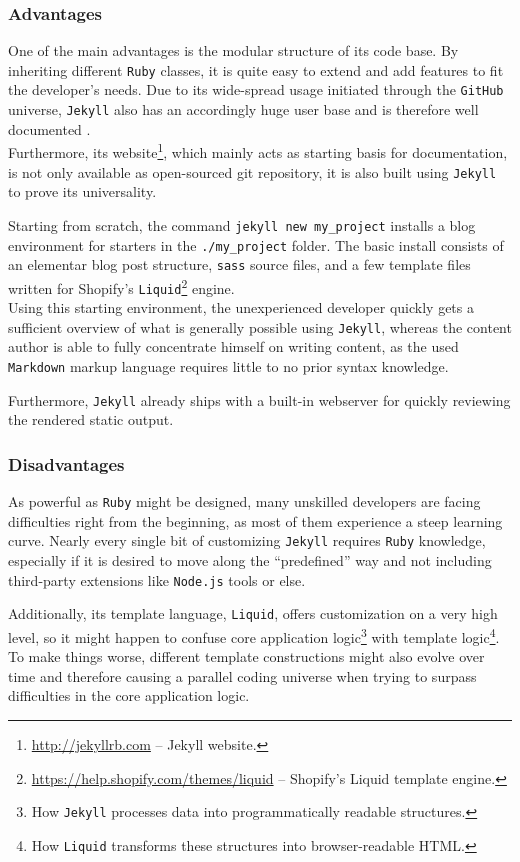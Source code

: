 \subsubsection{Advantages}
One of the main advantages is the modular structure of its code base. By inheriting different \texttt{Ruby} classes, it is quite easy to extend and add features to fit the developer's needs. Due to its wide-spread usage initiated through the \texttt{GitHub} universe, \texttt{Jekyll} also has an accordingly huge user base and is therefore well documented \cite[26]{dhillon2016}.\\ Furthermore, its website\footnote{\url{http://jekyllrb.com} -- Jekyll website.}, which mainly acts as starting basis for documentation, is not only available as open-sourced git repository, it is also built using \texttt{Jekyll} to prove its universality.

Starting from scratch, the command \texttt{jekyll new my\_project} installs a blog environment for starters in the \texttt{./my\_project} folder. The basic install consists of an elementar blog post structure, \texttt{sass} source files, and a few template files written for Shopify's \texttt{Liquid}\footnote{\url{https://help.shopify.com/themes/liquid} -- Shopify's Liquid template engine.} engine.\\
Using this starting environment, the unexperienced developer quickly gets a sufficient overview of what is generally possible using \texttt{Jekyll}, whereas the content author is able to fully concentrate himself on writing content, as the used \texttt{Markdown} markup language requires little to no prior syntax knowledge.

Furthermore, \texttt{Jekyll} already ships with a built-in webserver for quickly reviewing the rendered static output.

\subsubsection{Disadvantages}
As powerful as \texttt{Ruby} might be designed, many unskilled developers are facing difficulties right from the beginning, as most of them experience a steep learning curve. Nearly every single bit of customizing \texttt{Jekyll} requires \texttt{Ruby} knowledge, especially if it is desired to move along the ``predefined'' way and not including third-party extensions like \texttt{Node.js} tools or else.

Additionally, its template language, \texttt{Liquid}, offers customization on a very high level, so it might happen to confuse core application logic\footnote{How \texttt{Jekyll} processes data into programmatically readable structures.} with template logic\footnote{How \texttt{Liquid} transforms these structures into browser-readable HTML.}. To make things worse, different template constructions might also evolve over time and therefore causing a parallel coding universe when trying to surpass difficulties in the core application logic.

